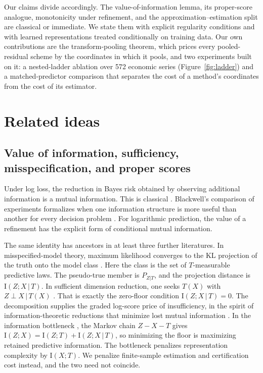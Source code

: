 \documentclass[11pt]{article}
\theoremstyle{remark}
\newcommand{\I}{\mathrm{I}}
\newcommand{\given}{\,|\,}
\begin{document}
Our claims divide accordingly. The value-of-information lemma, its proper-score
analogue, monotonicity under refinement, and the approximation--estimation split are classical
or immediate. We state them with explicit regularity conditions and with learned
representations
treated conditionally on training data. Our own contributions are the transform-pooling
theorem, which prices every pooled-residual scheme by the coordinates in which it pools, and
two experiments built on it: a nested-ladder ablation over 572 economic series
(Figure~\ref{fig:ladder}) and a matched-predictor comparison that separates the cost of a
method's coordinates from the cost of its estimator.

\section{Related ideas}\label{sec:related}

\subsection{Value of information, sufficiency, misspecification, and proper scores}

Under log loss, the reduction in Bayes risk obtained by observing additional information is a
mutual information. This is classical \citep{lindley1956measure,degroot1962uncertainty}.
Blackwell's comparison of experiments formalizes when one information structure is more useful
than another for every decision problem \citep{blackwell1953equivalent}. For logarithmic
prediction, the value of a refinement has the explicit form of conditional mutual
information.

The same identity has ancestors in at least three further literatures. In misspecified-model
theory, maximum likelihood converges to the KL projection of the truth onto the model class
\citep{white1982maximum}. Here the class is the set of $T$-measurable predictive laws. The
pseudo-true member is $P_{Z|T}$, and the projection distance is $\I(Z;X\given T)$. In
sufficient dimension reduction, one seeks $T(X)$ with $Z\perp X\given T(X)$
\citep{li1991sliced,fukumizu2004dimensionality}. That is exactly the zero-floor condition
$\I(Z;X\given T)=0$. The decomposition supplies the graded log-score price of
insufficiency, in the spirit of information-theoretic reductions that minimize lost mutual
information \citep{globerson2003sufficient}. In the information bottleneck
\citep{tishby1999information}, the Markov chain $Z-X-T$ gives
$\I(Z;X)=\I(Z;T)+\I(Z;X\given T)$, so minimizing the floor is maximizing retained
predictive information. The bottleneck penalizes representation complexity by $\I(X;T)$. We
penalize finite-sample estimation and certification cost instead, and the two need not
coincide.
\end{document}
